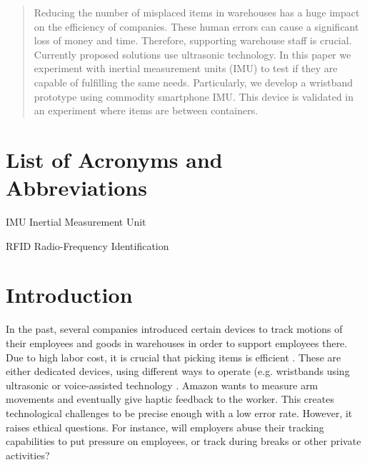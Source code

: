 \documentclass[12pt,twoside, hidelinks]{article}
\begin{document}
\maketitle


\begin{abstract}
\label{sec:abstract}

Reducing the number of misplaced items in warehouses has a huge impact on the efficiency of companies. These human errors can cause a significant loss of money and time. Therefore, supporting warehouse staff is crucial. Currently proposed solutions use ultrasonic technology. In this paper we experiment with inertial measurement units (IMU) to test if they are capable of fulfilling the same needs. Particularly, we develop a wristband prototype using commodity smartphone IMU. This device is validated in an experiment where items are between containers.

\end{abstract}

\tableofcontents

\section*{List of Acronyms and Abbreviations}

\begin{basedescript}{\desclabelstyle{\pushlabel}\desclabelwidth{10em}}
\item[IMU]					Inertial Measurement Unit
\item[RFID]					Radio-Frequency Identification
\end{basedescript}


\clearpage
\section{Introduction}
\label{sect:introduction}
In the past, several companies introduced certain devices to track motions of their employees and goods in warehouses in order to support employees there. Due to high labor cost, it is crucial that picking items is efficient \cite{frazelle2002}. These are either dedicated devices, using different ways to operate (e.g. wristbands using ultrasonic or voice-assisted technology \cite{bergerLudwig2007}. Amazon wants to measure arm movements and eventually give haptic feedback to the worker. This creates technological challenges to be precise enough with a low error rate. However, it raises ethical questions. For instance, will employers abuse their tracking capabilities to put pressure on employees, or track during breaks or other private activities?
\end{document}
